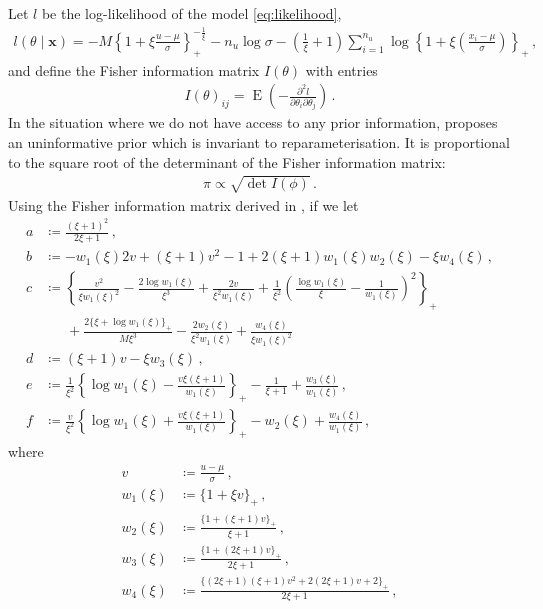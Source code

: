 \documentclass{article}
\DeclareMathOperator{\E}{E}
\begin{document}
%
Let $l$ be the log-likelihood of the model \eqref{eq:likelihood},
%
\begin{align*}
	l(\theta \mid \mathbf{x}) = 
		-M \left\{1 + \xi \frac{u - \mu}{\sigma}\right\}_+
		^ {-\frac{1}{\xi}} - n_u \log \sigma
		-\left(\frac{1}{\xi} + 1\right)\sum_{i = 1}^{n_u}
		\log\left\{1 + \xi\left(\frac{x_i - \mu}{\sigma}\right)\right\}_+ \,,
\end{align*}
%
and define the Fisher information matrix $I(\theta)$ with entries
%
\begin{align*}
	I(\theta)_{ij}
		= \E\left(-\frac{\partial^2 l}
		{\partial \theta_i \partial \theta_j}\right) \,.
\end{align*}
%
In the situation where we do not have access to any prior information,
\cite{jeffreys1946} proposes an uninformative prior
which is invariant to reparameterisation.
It is proportional to the square root of the determinant of the
Fisher information matrix:
%
\begin{align*}
	\pi \propto \sqrt{\det I(\phi)} \,.
\end{align*}
%
Using the Fisher information matrix derived in \cite{sharkey2017}, if we let
%
\begin{align*}
	a &\coloneqq \frac{(\xi + 1)^2}{2\xi + 1} \,, \\
	b &\coloneqq -w_1(\xi)2 v + (\xi + 1) v^2 - 1
  + 2(\xi + 1) w_1(\xi) w_2(\xi) - \xi w_4(\xi) \,, \\
	c &\coloneqq \left\{\frac{v^2}{\xi w_1(\xi)^2}
		- \frac{2\log w_1(\xi)}{\xi ^ 3}
	 + \frac{2v}{\xi ^ 2 w_1(\xi)}
	 + \frac{1}{\xi ^ 2}\left(\frac{\log w_1(\xi)}{\xi} - \frac{1}{w_1(\xi)}
		\right)^2 \right\}_+ \\
	&\ \phantom{=} + \frac{2\{\xi + \log w_1(\xi)\}_+}{M\xi ^ 3}
		- \frac{2w_2(\xi)}{\xi ^ 2w_1(\xi)}
	+ \frac{w_4(\xi)}{\xi w_1(\xi)^2} \\
	d &\coloneqq (\xi + 1)v - \xi w_3(\xi) \,, \\
	e &\coloneqq \frac{1}{\xi^2}\left\{\log w_1(\xi)
		-\frac{v \xi (\xi + 1)}{w_1(\xi)} \right\}_+ - \frac{1}{\xi + 1}
		+ \frac{w_3(\xi)}{w_1(\xi)} \,, \\
	f &\coloneqq \frac{v}{\xi ^2}\left\{\log w_1(\xi)
		+ \frac{v \xi (\xi + 1)}{w_1(\xi)} \right\}_+	
		- w_2(\xi) + \frac{w_4(\xi)}{w_1(\xi)} \,,
\end{align*}
%
where
%
\begin{align*}
	v &\coloneqq \frac{u - \mu}{\sigma} \,, \\
	w_1(\xi) &\coloneqq \{1 + \xi v\}_+ \,, \\
	w_2(\xi) &\coloneqq \frac{\{1 + (\xi + 1) v\}_+}{\xi + 1} \,, \\
	w_3(\xi) &\coloneqq \frac{\{1 + (2\xi + 1) v\}_+}{2\xi + 1} \,, \\
	w_4(\xi) &\coloneqq \frac{\{(2\xi + 1)(\xi + 1) v^2 
		+ 2(2\xi + 1) v + 2\}_+}{2\xi + 1} \,,
\end{align*}
\end{document}
